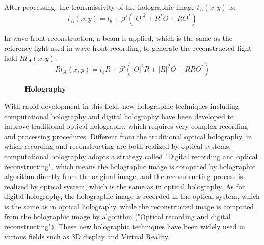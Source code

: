 \documentclass[10pt,a4paper,twocolumn,twoside,UTF8]{article}
\begin{document}
		After processing, the transmissivity of the holographic image $t_A(x, y)$ is:
		\begin{equation}
			t_A(x, y) = t_b + \beta '(|O|^2 + R^*O + RO^*)
			\label{eq.5.2}
		\end{equation}

		In wave front reconstruction, a beam is applied, which is the same as the reference light used in wave front recording, to generate the reconstructed light field $Rt_A(x,y)$.
		\begin{equation}
			Rt_A(x, y) = t_bR + \beta '(|O|^2R + |R|^2O + RRO^*)
			\label{eq.5.3}
		\end{equation}

		\begin{figure}[htbp]
			\centering		
			\caption{\textbf{Holography}}
		\end{figure}

		With rapid development in this field, new holographic techniques including computational holography and digital holography have been developed to improve traditional optical holography, which requires very complex recording and processing procedures. 
		Different from the traditional optical holography, in which recording and reconstructing are both realized by optical systems, computational holography adopts a strategy called "Digital recording and optical reconstructing", 
		which means the holographic image is computed by holographic algorithm directly from the original image, and the reconstructing process is realized by optical system, which is the same as in optical holography. 
		As for digital holography, the holographic image is recorded in the optical system, which is the same as in optical holography, while the reconstructed image is computed from the holographic image by algorithm ("Optical recording and digital reconstructing"). 
		These new holographic techniques have been widely used in various fields such as 3D display and Virtual Reality.
\end{document}

